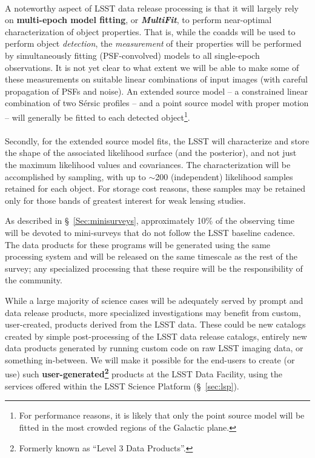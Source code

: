 \begin{itemize}
\\
A noteworthy aspect of LSST data release processing is that it will largely
rely on \textbf{multi-epoch model fitting}, or \textbf{\emph{MultiFit}}, to
perform near-optimal characterization of object properties. That is,
while the coadds will be used to perform object \emph{detection}, the
\emph{measurement} of their properties will be performed by
simultaneously fitting (PSF-convolved) models to all single-epoch
observations. It is not yet clear to what extent we will be able to make some of these
measurements on suitable linear combinations of input images (with careful propagation
of PSFs and noise).
An extended source model -- a constrained linear
combination of two S\'ersic profiles -- and a point source model with
proper motion -- will generally be
fitted to each detected object\footnote{For performance reasons, it is
  likely that only the point source model will be fitted in the most
  crowded regions of the Galactic plane.}.\\
\\
Secondly, for the extended source model fits, the LSST will
characterize and store the shape of the associated likelihood surface
(and the posterior), and not just the maximum likelihood values and
covariances. The characterization will be accomplished by sampling,
with up to $\sim$200 (independent) likelihood samples retained for
each object. For storage cost reasons, these samples
may be retained only for those bands of greatest interest for
weak lensing studies.

\end{itemize}

As described in \S~\ref{Sec:minisurveys}, approximately 10\% of the
observing time will be devoted to mini-surveys that do not follow the
LSST baseline cadence. The data products for these programs will be
generated using the same processing system and will be released on the
same timescale as the rest of the survey; any specialized processing
that these require will be the responsibility of the community.

While a large majority of science cases will be adequately served by prompt
and data release products, more specialized investigations may benefit from
custom, user-created, products derived from the LSST data.  These could be
new catalogs created by simple post-processing of the LSST data release
catalogs, entirely new data products generated by running custom code on raw
LSST imaging data, or something in-between.  We will make it possible for the
end-users to create (or use) such \textbf{user-generated\footnote{Formerly known as
``Level 3 Data Products''.}} products at the LSST Data Facility,
using the services offered within the LSST Science Platform (\S~\ref{sec:lsp}).


